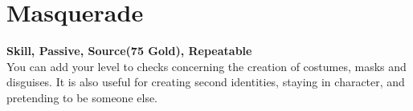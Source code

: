 \section{Masquerade}\label{sec:masquerade}
\textbf{Skill, Passive, Source(75 Gold), Repeatable}\\
You can add your level to checks concerning the creation of costumes, masks and disguises.
It is also useful for creating second identities, staying in character, and pretending to be someone else.